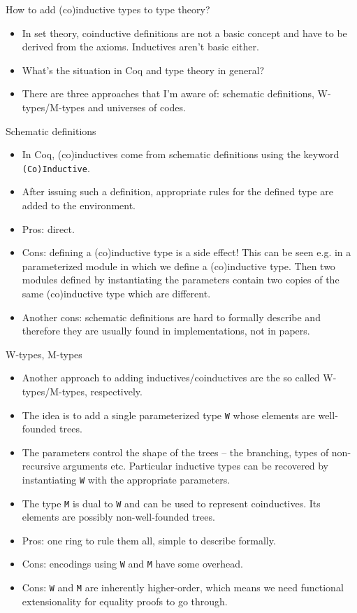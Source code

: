\documentclass{beamer}
\begin{document}
\begin{frame}{How to add (co)inductive types to type theory?}
\begin{itemize}
	\item In set theory, coinductive definitions are not a basic concept and have to be derived from the axioms. Inductives aren't basic either.
	\item What's the situation in Coq and type theory in general?
	\item There are three approaches that I'm aware of: schematic definitions, W-types/M-types and universes of codes.
\end{itemize}
\end{frame}

\begin{frame}{Schematic definitions}
\begin{itemize}
	\item In Coq, (co)inductives come from schematic definitions using the keyword \texttt{(Co)Inductive}.
	\item After issuing such a definition, appropriate rules for the defined type are added to the environment.
	\item Pros: direct.
	\item Cons: defining a (co)inductive type is a side effect! This can be seen e.g. in a parameterized module in which we define a (co)inductive type. Then two modules defined by instantiating the parameters contain two copies of the same (co)inductive type which are different.
	\item Another cons: schematic definitions are hard to formally describe and therefore they are usually found in implementations, not in papers.
\end{itemize}
\end{frame}

\begin{frame}{W-types, M-types}
\begin{itemize}
	\item Another approach to adding inductives/coinductives are the so called W-types/M-types, respectively.
	\item The idea is to add a single parameterized type \texttt{W} whose elements are well-founded trees.
	\item The parameters control the shape of the trees -- the branching, types of non-recursive arguments etc. Particular inductive types can be recovered by instantiating \texttt{W} with the appropriate parameters.
	\item The type \texttt{M} is dual to \texttt{W} and can be used to represent coinductives. Its elements are possibly non-well-founded trees.
	\item Pros: one ring to rule them all, simple to describe formally.
	\item Cons: encodings using \texttt{W} and \texttt{M} have some overhead.
	\item Cons: \texttt{W} and \texttt{M} are inherently higher-order, which means we need functional extensionality for equality proofs to go through.
\end{itemize}
\end{frame}
\end{document}
